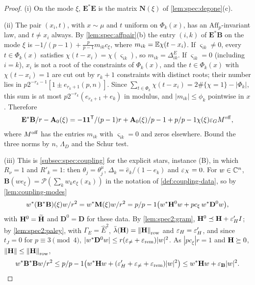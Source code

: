 \begin{proof}
(i) On the mode $\xi$, $\mathbf E^*\mathbf E$ is the matrix $\mathbf N(\xi)$ of
\cref{lem:spec:degone}(c).

(ii) The pair $(x_i,t)$, with $x\sim\mu$ and $t$ uniform on $\Phi_k(x)$, has an
$\mathrm{Aff}_p$-invariant law, and $t\ne x_i$ always. By \cref{lem:spec:affpair}(b) the
entry $(i,k)$ of $\mathbf E^*\mathbf B$ on the mode $\xi$ is $-1/(p-1)+\frac p{p-1}m_{ik}c_\xi$,
where $m_{ik}=\mathbb E\chi(t-x_i)$. If $\varsigma_{ik}\ne0$, every $t\in\Phi_k(x)$ satisfies
$\chi(t-x_i)=\chi(\varsigma_{ik})$, so $m_{ik}=\Delta^E_{ik}$. If $\varsigma_{ik}=0$ (including
$i=k$), $x_i$ is not a root of the constraints of $\Phi_k(x)$, and the
$t\in\Phi_k(x)$ with $\chi(t-x_i)=1$ are cut out by $r_k+1$ constraints with distinct
roots; their number lies in $p2^{-r_k-1}[1\pm e_{r_k+1}(p,n)]$. Since
$\sum_{t\in\Phi_k}\chi(t-x_i)=2\#\{\chi=1\}-|\Phi_k|$, this sum is at most
$p2^{-r_k}(e_{r_k+1}+\hat e_k)$ in modulus, and $|m_{ik}|\le\phi_k$ pointwise in $x$.
Therefore
\[
  \mathbf E^*\mathbf B/r-\mathbf A_{0}(\xi)=-\mathbf 1\mathbf 1^{\mathsf T}/(p-1)r+\mathbf A_{0}(\xi)/p-1
  +p/p-1\chi(\xi)\varepsilon_GM^{\rm off},
\]
where $M^{\rm off}$ has the entries $m_{ik}$ with $\varsigma_{ik}=0$ and zeros elsewhere.
Bound the three norms by $n$, $\Lambda_D$ and the Schur test.

(iii) This is \cref{subsec:spec:coupling} for the explicit stars, instance (B), in which
$R_\nu=1$ and $R'_k=1$: then $\theta_j=\theta^\mu_j$, $\Delta_k=\hat e_k/(1-\hat e_k)$ and $\varepsilon_X=0$.
For $w\in\mathbb C^n$, $\mathbf B(we_\xi)=\mathcal P(\sum_kw_ke_\xi(x_k))$ in the notation of
\cref{def:coupling-data}, so by \cref{lem:coupling-modes}
\[
  w^*(\mathbf B^*\mathbf B)(\xi)w/r^2=w^*\mathbf M(\xi)w/r^2
  =p/p-1\big(w^*\mathbf H^0w+pc_\xi\,w^*\mathbf D^0w\big),
\]
with $\mathbf H^0=\widetilde{\mathbf H}$ and $\mathbf D^0=\mathbf D$ for these data. By
\cref{lem:spec2:gram}, $\mathbf H^0\preceq\mathbf H+\varepsilon'_HI$; by \cref{lem:spec2:paley}, with
$\Gamma_E=\hat E^2$, $\bar\lambda(\mathbf H)=\left\|\mathbf H\right\|_{\rm row}$ and $\varepsilon_H=\varepsilon'_H$, and since
$t_J=0$ for $p\equiv3\pmod4$, $|w^*\mathbf D^0w|\le r(\varepsilon_{\ne}+\varepsilon_{\rm rem})|w|^2$. As $|pc_\xi|r=1$
and $\mathbf H\succeq0$, $\left\|\mathbf H\right\|\le\left\|\mathbf H\right\|_{\rm row}$,
\[
  w^*\mathbf B^*\mathbf Bw/r^2\le p/p-1\big(w^*\mathbf H w+(\varepsilon'_H+\varepsilon_{\ne}+\varepsilon_{\rm rem})|w|^2\big)
  \le w^*\mathbf H w+\varepsilon_{\mathbf B}|w|^2. \qedhere
\]
\end{proof}

